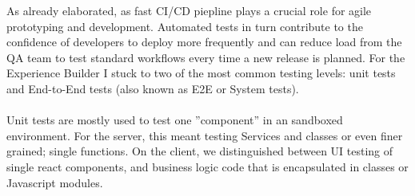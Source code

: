 As already elaborated, as fast CI/CD piepline plays a crucial role for agile prototyping and development. Automated tests in turn contribute to the confidence of
developers to deploy more frequently and can reduce load from the QA team to test standard workflows every time a new release is planned.
For the Experience Builder I stuck to two of the most common testing levels: unit tests and End-to-End tests (also known as E2E or System tests).
\\\\
Unit tests are mostly used to test one ''component'' in an sandboxed environment. For the server, this meant testing Services and classes or even finer grained; single functions.
On the client, we distinguished between UI testing of single react components, and business logic code that is encapsulated in classes or Javascript modules.

